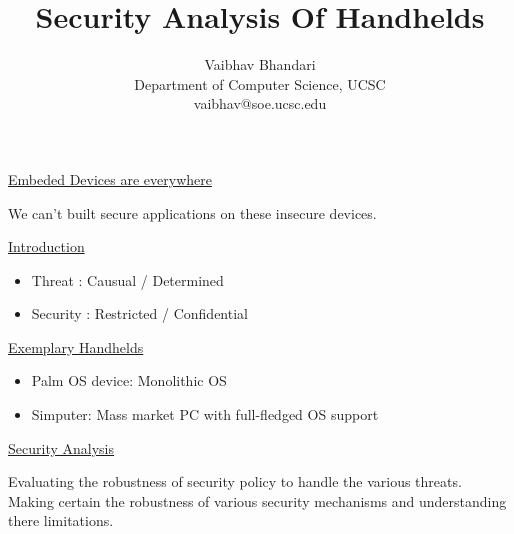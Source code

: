 \documentclass{slides}
\title{Security Analysis Of Handhelds}
\author{Vaibhav Bhandari\\
Department of Computer Science, UCSC\\
vaibhav@soe.ucsc.edu
}
\begin{document}
\maketitle

\begin{slide}
\begin{center}
\underline{Embeded Devices are everywhere}
\end{center}

We can't built secure applications on these insecure devices.

\end{slide}

\begin{slide}
\begin{center}
\underline{Introduction}
\end{center}
\begin{itemize}
\item Threat : Causual / Determined
\item Security : Restricted / Confidential
\end{itemize}
\end{slide}

\begin{slide}
\begin{center}
\underline{Exemplary Handhelds}
\end{center}
\begin{itemize}
\item Palm OS device: Monolithic OS
\item Simputer: Mass market PC with full-fledged OS support 
\end{itemize}
\end{slide}

\begin{slide}
\begin{center}
\underline{Security Analysis}
\end{center}

Evaluating the robustness of security policy to handle the
various threats.\\

Making certain the robustness of various security mechanisms
and understanding there limitations.
\end{slide}
\end{document}
